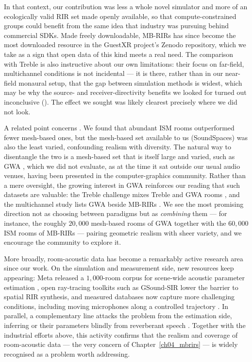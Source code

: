 In that context, our contribution was less a whole novel simulator and more of an
ecologically valid \acrshort{RIR} set made openly available, so that
compute-constrained groups could benefit from the same idea that industry was
pursuing behind commercial SDKs. Made freely downloadable,
MB-RIRs has since become the most downloaded resource in the GuestXR
project's Zenodo repository, which we take as a sign that open data of this kind
meets a real need. The comparison with Treble is also instructive about our own
limitations: their focus on far-field, multichannel conditions is not incidental
--- it is there, rather than in our near-field monaural setup, that the gap
between simulation methods is widest, which may be why the source- and
receiver-directivity benefits we looked for turned out inconclusive
(). The effect we sought was likely clearest precisely where we did
not look.

A related point concerns . We found that abundant \acrshort{ISM}
rooms outperformed fewer mesh-based ones, but the mesh-based set available to us
(SoundSpaces) was also the least varied, confounding realism with diversity. The
natural way to disentangle the two is a mesh-based set that is itself large and
varied, such as GWA \citep{tang2022gwa}, which we did not evaluate, as at the
time it sat outside our usual audio venues, having been presented in the
computer-graphics community. Rather than a mere oversight, the growing interest
in GWA reinforces our reading that such datasets are valuable: the Treble
challenge mixes Treble and GWA rooms \citep{lin2025generative}, and the
multichannel study lists GWA beside MB-RIRs \citep{gotz2026improving}.
We see the most promising direction not as choosing between paradigms but as
\emph{combining} them --- for instance, the roughly $20{,}000$ mesh-based rooms of
GWA together with the $60{,}000$ \acrshort{ISM} rooms of MB-RIRs ---
pairing geometric realism with sheer variety, and we encourage the community to
explore it.

More broadly, room-acoustic data has become a remarkably active research area
since our work. On the simulation and measurement side, new resources keep
appearing: Meta released a $1{,}000$-room corpus for scene-wide acoustic
parameter estimation \citep{falconperez2025scenewide}, open ray-tracing toolkits
such as GSound-SIR \citep{zang2025gsound} lower the barrier to spatial
\acrshort{RIR} synthesis, and measured databases now capture more challenging
conditions, including moving microphones along a controlled trajectory
\citep{damiano2025trajectorir}. In parallel, a complementary line attacks the
problem from the estimation side, inferring  or their parameters
blindly from reverberant speech \citep{gotz2026matching, wang2026recrir}.
Together with the industrial efforts above, this activity confirms that the
realism and coverage of room-acoustic data --- the very concern of
Chapter~\ref{ch04_mbrirs} --- is widely recognised as a problem worth
addressing.

